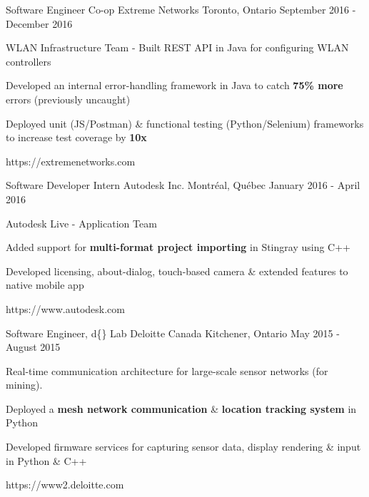 \begin{cventries}

\cventrylink
{Software Engineer Co-op}
{Extreme Networks}
{Toronto, Ontario}
{September 2016 - December 2016}
{ %
WLAN Infrastructure Team - Built REST API in Java for configuring WLAN controllers
\begin{cvitems}
\item[]
\item {Developed an internal error-handling framework in Java to catch \textbf{75\% more} errors (previously uncaught)}
\item {Deployed unit (JS/Postman) \& functional testing (Python/Selenium) frameworks to increase test coverage by \textbf{10x}}
\end{cvitems}
}
{https://extremenetworks.com}


\cventrylink
{Software Developer Intern}
{Autodesk Inc.}
{Montréal, Québec}
{January 2016 - April 2016}
{ %
Autodesk Live - Application Team
\begin{cvitems}
\item[]
\item {Added support for \textbf{multi-format project importing} in Stingray using C++}
\item {Developed licensing, about-dialog, touch-based camera \& extended features to native mobile app}
\end{cvitems}
}
{https://www.autodesk.com}


\cventrylink
{Software Engineer, d\{\} Lab}
{Deloitte Canada} %
{Kitchener, Ontario} %
{May 2015 - August 2015} %
{
Real-time communication architecture for large-scale sensor networks (for mining).
\begin{cvitems}
\item[]
\item {Deployed a \textbf{mesh network communication} \& \textbf{location tracking system} in Python}
\item {Developed firmware services for capturing sensor data, display rendering \& input in Python \& C++}
\end{cvitems}
}
{https://www2.deloitte.com}



\end{cventries}
